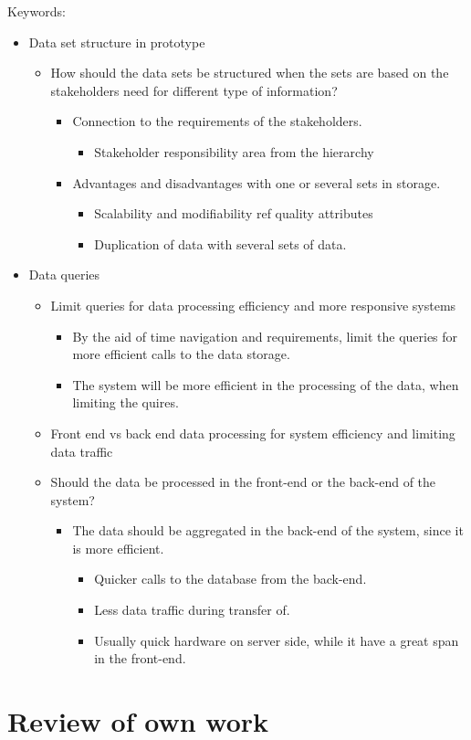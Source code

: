 Keywords:
\begin{itemize}
	\item Data set structure in prototype
	\begin{itemize}
		\item How should the data sets be structured when the sets are based 
		on the stakeholders need for different type of information?
		\begin{itemize}
			\item Connection to the requirements of the stakeholders.
			\begin{itemize}
				\item Stakeholder responsibility area from the hierarchy
			\end{itemize}
			\item Advantages and disadvantages with one or several sets in storage.
			\begin{itemize}
				\item Scalability and modifiability ref quality attributes \cite{Bass:2012:SAP:2392670}
				\item Duplication of data with several sets of data.
			\end{itemize}
		\end{itemize}
	\end{itemize}
	\item Data queries
	\begin{itemize}
		\item Limit queries for data processing efficiency 
		and more responsive systems
		\begin{itemize}
			\item By the aid of time navigation and requirements, limit the 
			queries for more efficient calls to the data storage.
			\item The system will be more efficient in the processing of the 
			data, when limiting the quires.
		\end{itemize}
		\item Front end vs back end data processing for system efficiency and
		limiting data traffic
		\item Should the data be processed in the front-end or the back-end 
		of the system?
		\begin{itemize}
			\item The data should be aggregated in the back-end of the system, 
			since it is more efficient.
			\begin{itemize}
				\item Quicker calls to the database from the back-end.
				\item Less data traffic during transfer of.
				\item Usually quick hardware on server side, while it have a 
				great span in the front-end.
			\end{itemize}
		\end{itemize}
	\end{itemize}
\end{itemize}

\section{Review of own work} %
\label{sec:review_of_own_work}
